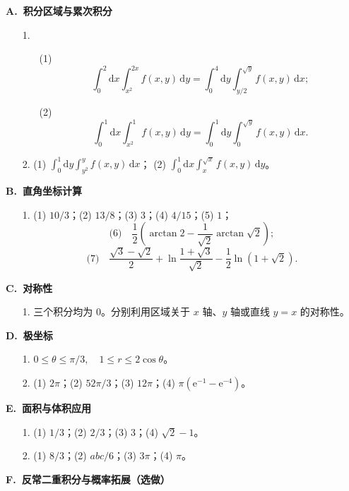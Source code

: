 \documentclass[fontset=fandol]{ctexart}
\newcommand{\dd}{\mathrm{d}}
\newcommand{\ee}{\mathrm{e}}
\begin{document}
\textbf{A.\ 积分区域与累次积分}

\begin{enumerate}
\item[1.]
\begin{enumerate}
\item[(1)]
\[
\int_0^2\dd x\int_{x^2}^{2x}f(x,y)\,\dd y
=\int_0^4\dd y\int_{y/2}^{\sqrt y}f(x,y)\,\dd x;
\]
\item[(2)]
\[
\int_0^1\dd x\int_{x^2}^{1}f(x,y)\,\dd y
=\int_0^1\dd y\int_0^{\sqrt y}f(x,y)\,\dd x.
\]
\end{enumerate}
\item[2.] (1) $\displaystyle \int_0^1\dd y\int_{y^2}^{y}f(x,y)\,\dd x$；
(2) $\displaystyle \int_0^1\dd x\int_x^{\sqrt x}f(x,y)\,\dd y$。
\end{enumerate}

\textbf{B.\ 直角坐标计算}

\begin{enumerate}
\item[1.] (1) $10/3$；(2) $13/8$；(3) $3$；(4) $4/15$；(5) $1$；
\[
\text{(6)}\quad
\frac12\left(\arctan2-\frac1{\sqrt2}\arctan\sqrt2\right);
\]
\[
\text{(7)}\quad
\frac{\sqrt3-\sqrt2}{2}
+\ln\frac{1+\sqrt3}{\sqrt2}
-\frac12\ln(1+\sqrt2).
\]
\end{enumerate}

\textbf{C.\ 对称性}

\begin{enumerate}
\item[1.] 三个积分均为 $0$。分别利用区域关于 $x$ 轴、$y$ 轴或直线 $y=x$ 的对称性。
\end{enumerate}

\textbf{D.\ 极坐标}

\begin{enumerate}
\item[1.] $\displaystyle 0\leq\theta\leq\pi/3,\quad 1\leq r\leq2\cos\theta$。
\item[2.] (1) $2\pi$；(2) $52\pi/3$；(3) $12\pi$；(4) $\displaystyle \pi(\ee^{-1}-\ee^{-4})$。
\end{enumerate}

\textbf{E.\ 面积与体积应用}

\begin{enumerate}
\item[1.] (1) $1/3$；(2) $2/3$；(3) $3$；(4) $\sqrt2-1$。
\item[2.] (1) $8/3$；(2) $abc/6$；(3) $3\pi$；(4) $\pi$。
\end{enumerate}

\textbf{F.\ 反常二重积分与概率拓展（选做）}
\end{document}

